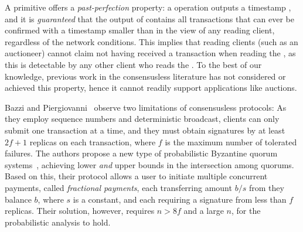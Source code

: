 A \podtm primitive offers a \emph{past-perfection} property:
a \opread{} operation outputs a timestamp \rperf, and it is \emph{guaranteed}
that the output of \opread{} contains all transactions that can ever be confirmed with a timestamp smaller than \rperf in the view of any reading client, regardless of the network conditions.
This implies that reading clients (such as an auctioneer) cannot claim not having received a transaction when reading the \podtm, as this is detectable by any other client who reads the \podtm.
To the best of our knowledge, previous work in the consensusless literature has not considered or achieved this property,
hence it cannot readily support applications like auctions.

Bazzi and Piergiovanni~\cite{PODC:BazPie24} observe two limitations of consensusless protocols: As they employ sequence numbers and deterministic broadcast,
clients can only submit one transaction at a time, and they must obtain signatures by at least $2f+1$ replicas on each transaction,
where $f$ is the maximum number of tolerated failures.
The authors propose a new type of probabilistic Byzantine quorum systems~\cite{DBLP:journals/iandc/MalkhiRWW01},
achieving lower \emph{and} upper bounds in the intersection among quorums.
Based on this, their protocol allows a user to initiate multiple concurrent payments, called \emph{fractional payments},
each transferring amount $b / s$ from they balance $b$, where $s$ is a constant,
and each requiring a signature from less than $f$ replicas.
Their solution, however, requires $n > 8f$ and a large $n$, for the probabilistic analysis to hold.
